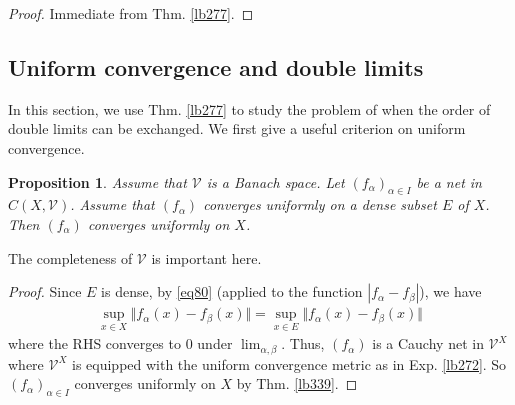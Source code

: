 \documentclass[12pt,b5paper,notitlepage]{article}
\theoremstyle{definition}
\theoremstyle{plain}
\newtheorem{pp}[df]{Proposition}
\newcommand{\mc}{\mathcal}
\numberwithin{equation}{section}
\begin{document}
\begin{proof}
Immediate from Thm. \ref{lb277}.
\end{proof}









\subsection{Uniform convergence and double limits}



In this section, we use Thm. \ref{lb277} to study the problem of when the order of double limits can be exchanged. We first give a useful criterion on uniform convergence.


\begin{pp}\label{lb288}
Assume that $\mc V$ is a Banach space. Let $(f_\alpha)_{\alpha\in I}$ be a net in $C(X,\mc V)$. Assume that $(f_\alpha)$ converges uniformly on a dense subset $E$ of $X$. Then $(f_\alpha)$ converges uniformly on $X$.
\end{pp}

The completeness of $\mc V$ is important here.

\begin{proof}
Since $E$ is dense, by \eqref{eq80} (applied to the function $|f_\alpha-f_\beta|$), we have
\begin{align*}
\sup_{x\in X}\Vert f_\alpha(x)-f_\beta(x)\Vert=\sup_{x\in E}\Vert f_\alpha(x)-f_\beta(x)\Vert
\end{align*}
where the RHS converges to $0$ under $\lim_{\alpha,\beta}$. Thus, $(f_\alpha)$ is a Cauchy net in $\mc V^X$ where $\mc V^X$ is equipped with the uniform convergence metric as in Exp. \ref{lb272}. So $(f_\alpha)_{\alpha\in I}$ converges uniformly on $X$ by Thm. \ref{lb339}.
\end{proof}
\end{document}
